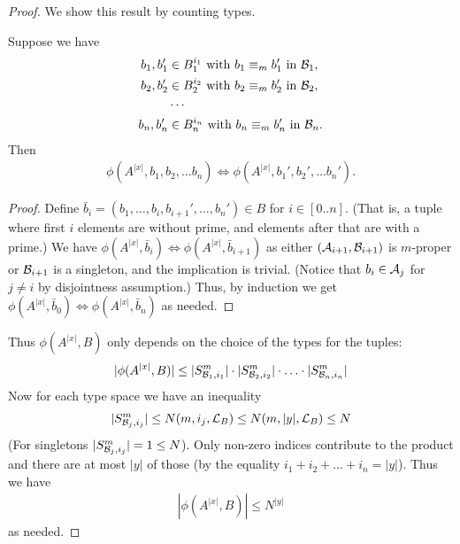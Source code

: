 \begin{proof}
  We show this result by counting types.
  \begin{Claim}
    Suppose we have
    \begin{align*}
      b_1, b_1' &\in B_1^{i_1} \text{ with } b_1 \equiv_m b_1' \text { in } \mathcal B_1, \\
      b_2, b_2' &\in B_2^{i_2} \text{ with } b_2 \equiv_m b_2' \text { in } \mathcal B_2, \\
                &\cdots \\
      b_n, b_n' &\in B_n^{i_n} \text{ with } b_n \equiv_m b_n' \text { in } \mathcal B_n.
    \end{align*}
    Then
    \begin{align*}
      \phi(A^{|x|}, b_1, b_2, \ldots b_n) \iff \phi(A^{|x|}, b_1', b_2', \ldots b_n').
    \end{align*}
  \end{Claim}
  \begin{proof}
    Define $\bar b_i = (b_1, \ldots, b_i, b_{i+1}', \ldots, b_n') \in B$ for $i \in [0..n]$.
    (That is, a tuple where first $i$ elements are without prime, and elements after that are with a prime.)
    We have $\phi(A^{|x|}, \bar b_i) \iff \phi(A^{|x|}, \bar b_{i+1})$ as either $(\mathcal A_{i+1}, \mathcal B_{i+1})$ is $m$-proper
    or $\mathcal B_{i+1}$ is a singleton, and the implication is trivial.
    (Notice that $b_i \in \mathcal A_j$ for $j \neq i$ by disjointness assumption.)
    Thus, by induction we get $\phi(A^{|x|}, \bar b_0) \iff \phi(A^{|x|}, \bar b_n)$ as needed.
  \end{proof}
  Thus $\phi(A^{|x|}, B)$ only depends on the choice of the types for the tuples:
  \begin{align*}
    |\phi(A^{|x|}, B)| \leq |S^m_{\mathcal B_1, i_1}| \cdot |S^m_{\mathcal B_2, i_2}| \cdot \ldots \cdot |S^m_{\mathcal B_n, i_n}|
  \end{align*}
  Now for each type space we have an inequality
  \begin{align*}
    |S^m_{\mathcal B_j, i_j}| \leq N(m, i_j, \mathcal L_B) \leq N(m, |y|, \mathcal L_B) \leq N
  \end{align*}
  (For singletons $|S^m_{\mathcal B_j, i_j}| = 1 \leq N$). Only non-zero indices contribute to the product and there are at most $|y|$ of those (by the equality $i_1 + i_2 + \ldots + i_n = |y|$). Thus we have
  \begin{align*}
    |\phi(A^{|x|}, B)| \leq N^{|y|}
  \end{align*}
  as needed.
\end{proof}

